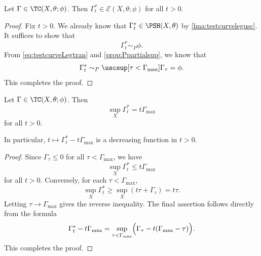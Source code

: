 \begin{corollary}\label{cor:GammastarP}
    Let $\Gamma \in \TC(X,\theta;\phi)$. Then $\Gamma^*_t\in \mathcal{E}(X,\theta;\phi)$ for all $t>0$.
\end{corollary}
\begin{proof}
Fix $t>0$.
    We already know that $\Gamma^*_t\in \PSH(X,\theta)$ by \cref{lma:testcurvelegusc}. It suffices to show that
    \[
    \Gamma^*_t\sim_P \phi.
    \]
    From \eqref{eq:testcurveLegtran} and \cref{prop:Ppartialsup}, we know that
    \[
    \Gamma^*_t\sim_P \uscsup[\tau<\Gamma_{\max}] \Gamma_{\tau}=\phi.
    \]
    This completes the proof.
\end{proof}

\begin{lemma}\label{lma:suplegenlinear}
    Let $\Gamma\in \TC(X,\theta;\phi)$. Then
    \[
        \sup_X \Gamma_t^*=t\Gamma_{\max}
    \]
    for all $t>0$.

    In particular, $t\mapsto \Gamma^*_t-t\Gamma_{\max}$ is a decreasing function in $t>0$.
\end{lemma}
\begin{proof}
    Since $\Gamma_{\tau}\leq 0$ for all $\tau<\Gamma_{\max}$, we have
    \[
        \sup_X \Gamma_t^*\leq t\Gamma_{\max}
    \]
    for all $t>0$.
    Conversely, for each $\tau<\Gamma_{\max}$,
    \[
        \sup_X\Gamma_t^*\geq \sup_X(t\tau+\Gamma_{\tau})=t\tau.
    \]
    Letting $\tau\to\Gamma_{\max}$ gives the reverse inequality.
    The final assertion follows directly from the formula
    \[
        \Gamma_t^*-t\Gamma_{\max}=\sup_{\tau<\Gamma_{\max}}\Bigl(\Gamma_\tau-t(\Gamma_{\max}-\tau)\Bigr).
    \]
    This completes the proof.
\end{proof}

